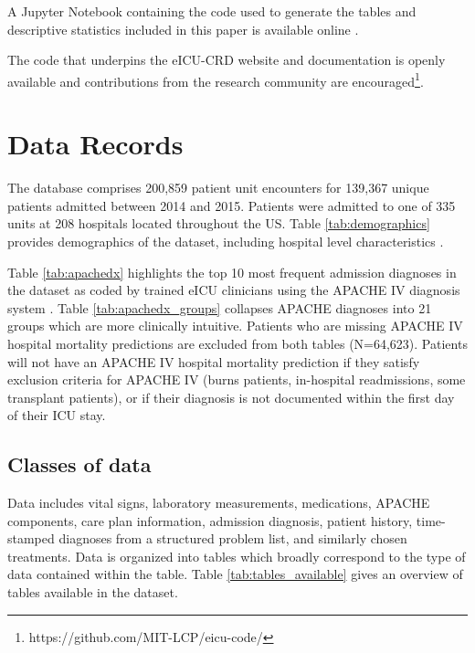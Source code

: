 \documentclass[english]{article}
\begin{document}

A Jupyter Notebook containing the code used to generate the tables and descriptive statistics included in this paper is available online \cite{eicu-data-paper}.

The code that underpins the eICU-CRD website and documentation is openly available and contributions from the research community are encouraged\footnote{https://github.com/MIT-LCP/eicu-code/}.

\section*{Data Records}\label{data-records}

The database comprises 200,859 patient unit encounters for 139,367 unique
patients admitted between 2014 and 2015. Patients were admitted to one
of 335 units at 208 hospitals located throughout the US. Table \ref{tab:demographics} provides demographics of the dataset, including hospital level characteristics \cite{tableone}.

Table \ref{tab:apachedx} highlights the top 10 most frequent admission diagnoses in the dataset as coded by trained eICU clinicians using the APACHE IV
diagnosis system \cite{zimmerman2006acute}.
Table \ref{tab:apachedx_groups} collapses APACHE
diagnoses into 21 groups which are more clinically intuitive. Patients
who are missing APACHE IV hospital mortality predictions are excluded
from both tables (N=64,623). Patients will not have an APACHE IV
hospital mortality prediction if they satisfy exclusion criteria for
APACHE IV (burns patients, in-hospital readmissions, some transplant
patients), or if their diagnosis is not documented within the first day
of their ICU stay.

\subsection*{Classes of data}\label{classes-of-data}

Data includes vital signs, laboratory measurements, medications, APACHE
components, care plan information, admission diagnosis, patient history,
time-stamped diagnoses from a structured problem list, and similarly
chosen treatments. Data is organized into tables which broadly
correspond to the type of data contained within the table. Table \ref{tab:tables_available} gives
an overview of tables available in the dataset.
\end{document}
